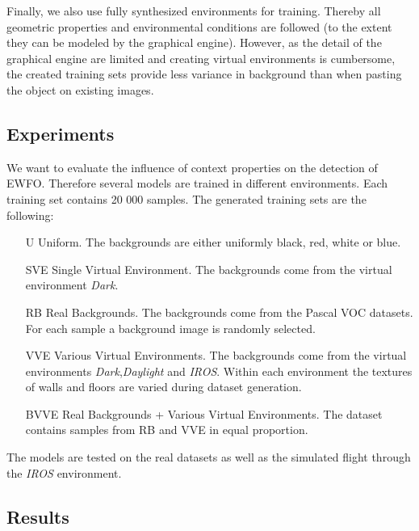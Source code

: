 Finally, we also use fully synthesized environments for training. Thereby all geometric properties and environmental conditions are followed (to the extent they can be modeled by the graphical engine). However, as the detail of the graphical engine are limited and creating virtual environments is cumbersome, the created training sets provide less variance in background than when pasting the object on existing images.

\subsection{Experiments}

We want to evaluate the influence of context properties on the detection of \ac{EWFO}. Therefore several models are trained in different environments. Each training set contains 20 000 samples. The generated training sets are the following:

\begin{itemize}
	\item[U] Uniform. The backgrounds are either uniformly black, red, white or blue.
	\item[SVE] Single Virtual Environment. The backgrounds come from the virtual environment \textit{Dark}.
	\item[RB] Real Backgrounds. The backgrounds come from the Pascal VOC datasets. For each sample a background image is randomly selected.
	\item[VVE] Various Virtual Environments. The backgrounds come from the virtual environments \textit{Dark},\textit{Daylight} and \textit{IROS}. Within each environment the textures of walls and floors are varied during dataset generation.
	\item[BVVE] Real Backgrounds + Various Virtual Environments. The dataset contains samples from RB and VVE in equal proportion.
\end{itemize}

The models are tested on the real datasets as well as the simulated flight through the \textit{IROS} environment.


\subsection{Results}

